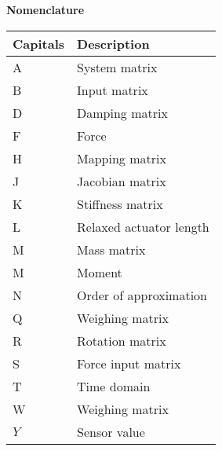 \begin{spacing}{0.9}

\Large{\textbf{Nomenclature}}

\begin{multicols}{2}
\begin{table}[H]
\centering
    \begin{tabular}{p{1.7cm} p{4.8cm}} \hline
    \textbf{Capitals}    &   \textbf{Description }\\ \hline
    A      &  System matrix \\
    B     &  Input matrix \\
    D     &  Damping matrix \\
    F     & Force \\
    H     &  Mapping matrix \\
    J     &  Jacobian matrix \\
    K     &  Stiffness matrix \\
    L     &  Relaxed actuator length \\
    M     &  Mass matrix \\
    M     &  Moment \\
    N     & Order of approximation \\

    Q     & Weighing matrix \\
    R     & Rotation matrix \\
    S     & Force input matrix \\
    T     & Time domain \\
    W     & Weighing matrix \\
    $Y$     & Sensor value \\ \hline
    \end{tabular}
\end{table}




\end{multicols}
\end{spacing}
